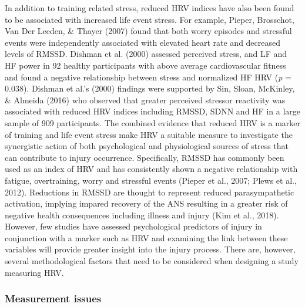 \documentclass[
  english,
  man,floatsintext]{apa6}
\begin{document}
In addition to training related stress, reduced HRV indices have also been found to be associated with increased life event stress.
For example, Pieper, Brosschot, Van Der Leeden, \& Thayer (2007)
found that both worry episodes and stressful events were independently associated with elevated heart rate and decreased levels of RMSSD.
Dishman et al. (2000)
assessed perceived stress, and LF and HF power in 92 healthy participants with above average cardiovascular fitness and found a negative relationship between stress and normalized HF HRV (\emph{p} = 0.038).
Dishman et al.'s (2000) findings were supported by Sin, Sloan, McKinley, \& Almeida (2016)
who observed that greater perceived stressor reactivity was associated with reduced HRV indices including RMSSD, SDNN and HF in a large sample of 909 participants.
The combined evidence that reduced HRV is a marker of training and life event stress make HRV a suitable measure to investigate the synergistic action of both psychological and physiological sources of stress that can
contribute to injury occurrence.
Specifically, RMSSD has commonly been used as an index of HRV and has consistently shown a negative relationship with fatigue, overtraining, worry and stressful events (Pieper et al., 2007; Plews et al., 2012).
Reductions in RMSSD are thought to represent reduced parasympathetic activation, implying impared recovery of the ANS resulting in a greater risk of negative health consequences including illness and injury (Kim et al., 2018).
However, few studies have assessed psychological predictors of injury in conjunction with a marker such as HRV and examining the link between these variables will provide greater insight into the injury process.
There are, however, several methodological factors that need to be considered when designing a study measuring HRV.

\hypertarget{measurement-issues}{%
\subsubsection{Measurement issues}\label{measurement-issues}}
\end{document}

